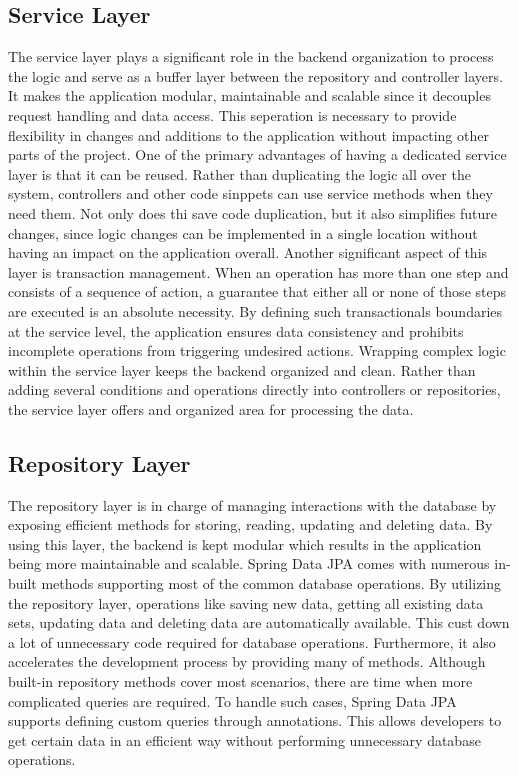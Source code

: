     \subsection{Service Layer}
    The service layer plays a significant role in the backend organization to process the logic and serve as a buffer layer between the repository and controller layers. It makes the application modular, maintainable and scalable since it decouples request handling and data access. This seperation is necessary to provide flexibility in changes and additions to the application without impacting other parts of the project. \newline
    One of the primary advantages of having a dedicated service layer is that it can be reused. Rather than duplicating the logic all over the system, controllers and other code sinppets can use service methods when they need them. Not only does thi save code duplication, but it also simplifies future changes, since logic changes can be implemented in a single location without having an impact on the application overall. \newline
    Another significant aspect of this layer is transaction management. When an operation has more than one step and consists of a sequence of action, a guarantee that either all or none of those steps are executed is an absolute necessity. By defining such transactionals boundaries at the service level, the application ensures data consistency and prohibits incomplete operations from triggering undesired actions. \newline
    Wrapping complex logic within the service layer keeps the backend organized and clean. Rather than adding several conditions and operations directly into controllers or repositories, the service layer offers and organized area for processing the data. 

    \subsection{Repository Layer}
    The repository layer is in charge of managing interactions with the database by exposing efficient methods for storing, reading, updating and deleting data. By using this layer, the backend is kept modular which results in the application being more maintainable and scalable. \newline
    Spring Data JPA comes with numerous in-built methods supporting most of the common database operations. By utilizing the repository layer, operations like saving new data, getting all existing data sets, updating data and deleting data are automatically available. This cust down a lot of unnecessary code required for database operations. Furthermore, it also accelerates the development process by providing many of methods. \newline
    Although built-in repository methods cover most scenarios, there are time when more complicated queries are required. To handle such cases, Spring Data JPA supports defining custom queries through annotations. This allows developers to get certain data in an efficient way without performing unnecessary database operations.

